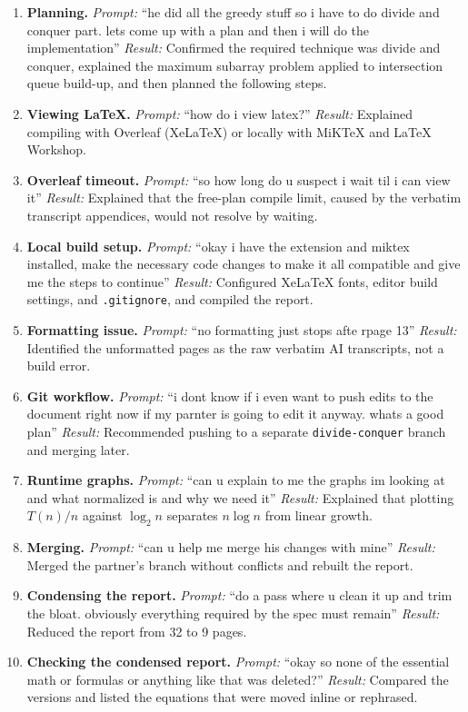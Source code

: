 \begin{enumerate}

\item \textbf{Planning.}
\emph{Prompt:} ``he did all the greedy stuff so i have to
do divide and conquer part. lets come up with a plan
and then i will do the implementation''
\emph{Result:} Confirmed the required technique was
divide and conquer, explained the maximum subarray
problem applied to intersection queue build-up, and
then planned the following steps.

\item \textbf{Viewing LaTeX.}
\emph{Prompt:} ``how do i view latex?''
\emph{Result:} Explained compiling with Overleaf
(XeLaTeX) or locally with MiKTeX and LaTeX Workshop.

\item \textbf{Overleaf timeout.}
\emph{Prompt:} ``so how long do u suspect i wait til i
can view it''
\emph{Result:} Explained that the free-plan compile
limit, caused by the verbatim transcript appendices,
would not resolve by waiting.

\item \textbf{Local build setup.}
\emph{Prompt:} ``okay i have the extension and miktex
installed, make the necessary code changes to make it
all compatible and give me the steps to continue''
\emph{Result:} Configured XeLaTeX fonts, editor build
settings, and \texttt{.gitignore}, and compiled the
report.

\item \textbf{Formatting issue.}
\emph{Prompt:} ``no formatting just stops afte rpage
13''
\emph{Result:} Identified the unformatted pages as the
raw verbatim AI transcripts, not a build error.

\item \textbf{Git workflow.}
\emph{Prompt:} ``i dont know if i even want to push
edits to the document right now if my parnter is going
to edit it anyway. whats a good plan''
\emph{Result:} Recommended pushing to a separate
\texttt{divide-conquer} branch and merging later.

\item \textbf{Runtime graphs.}
\emph{Prompt:} ``can u explain to me the graphs im
looking at and what normalized is and why we need it''
\emph{Result:} Explained that plotting $T(n)/n$ against
$\log_2 n$ separates $n\log n$ from linear growth.

\item \textbf{Merging.}
\emph{Prompt:} ``can u help me merge his changes with
mine''
\emph{Result:} Merged the partner's branch without
conflicts and rebuilt the report.

\item \textbf{Condensing the report.}
\emph{Prompt:} ``do a pass where u clean it up and trim
the bloat. obviously everything required by the spec
must remain''
\emph{Result:} Reduced the report from 32 to 9
pages.

\item \textbf{Checking the condensed report.}
\emph{Prompt:} ``okay so none of the essential math or
formulas or anything like that was deleted?''
\emph{Result:} Compared the versions and listed the
equations that were moved inline or rephrased.

\end{enumerate}
